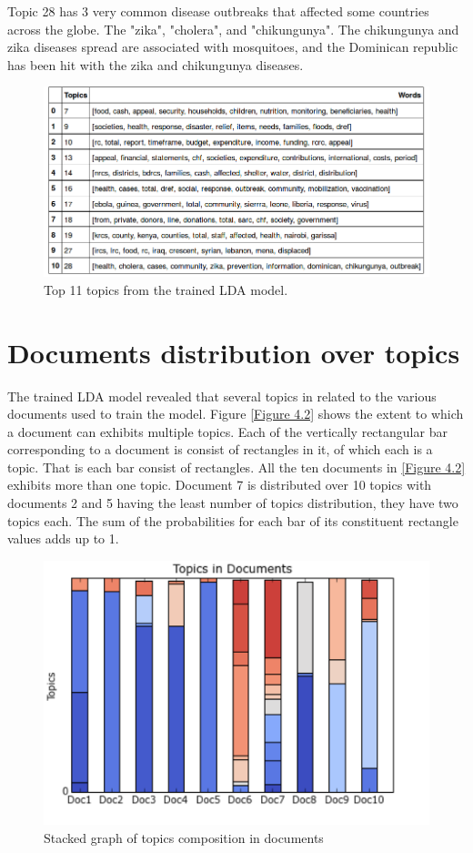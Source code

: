 Topic 28 has 3 very common disease outbreaks that affected some countries across the globe. The "zika", "cholera", and "chikungunya". The chikungunya and zika diseases spread are associated with mosquitoes, and the Dominican republic has been hit with the zika and chikungunya diseases. 
\begin{figure}[hb]
\centering
\includegraphics[scale=0.6]{c4_2.png}
\caption{Top 11 topics from the trained LDA model.}
\end{figure}\label{Table 4.1}
\section{Documents distribution over topics}
The trained LDA model revealed that several topics in related to the various documents used to train the model. Figure \eqref{Figure 4.2} shows the extent to which a document can exhibits multiple topics. Each of the vertically rectangular bar corresponding to a document is consist
of rectangles in it, of which each is a topic. That is each bar consist of rectangles.
All the ten documents in \eqref{Figure 4.2} exhibits more than one topic. Document 7 is distributed over 10 topics with documents 2 and 5 having the least number of topics distribution,  they have two topics each. The sum of the probabilities for each bar of its constituent rectangle values adds up to 1.
\begin{figure}[h]
\centering
\includegraphics[scale=0.85]{c4_3.png}
\caption{Stacked graph of topics composition in documents}\label{Figure 4.2}
\end{figure}
